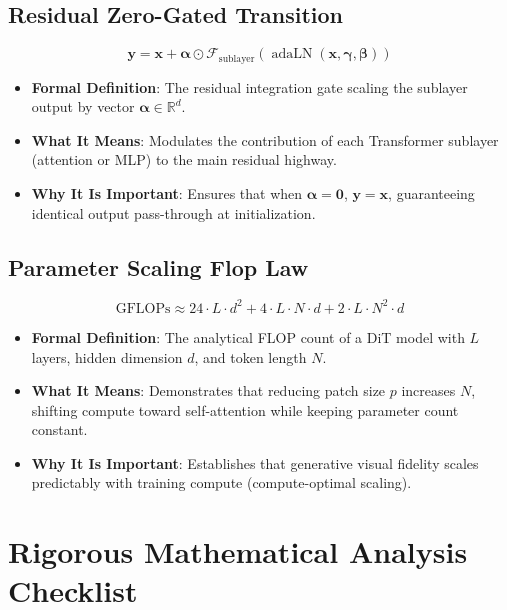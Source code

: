 \documentclass[11pt,a4paper]{article}
\theoremstyle{definition}
\begin{document}
\subsection{Residual Zero-Gated Transition}
{\boldmath
\begin{equation}
\mathbf{y} = \mathbf{x} + \boldsymbol{\alpha} \odot \mathcal{F}_{\text{sublayer}}(\operatorname{adaLN}(\mathbf{x}, \boldsymbol{\gamma}, \boldsymbol{\beta}))
\end{equation}
}
\begin{itemize}
    \item \textbf{Formal Definition}: The residual integration gate scaling the sublayer output by vector $\boldsymbol{\alpha} \in \mathbb{R}^d$.
    \item \textbf{What It Means}: Modulates the contribution of each Transformer sublayer (attention or MLP) to the main residual highway.
    \item \textbf{Why It Is Important}: Ensures that when $\boldsymbol{\alpha} = \mathbf{0}$, $\mathbf{y} = \mathbf{x}$, guaranteeing identical output pass-through at initialization.
\end{itemize}

\subsection{Parameter Scaling Flop Law}
{\boldmath
\begin{equation}
\text{GFLOPs} \approx 24 \cdot L \cdot d^2 + 4 \cdot L \cdot N \cdot d + 2 \cdot L \cdot N^2 \cdot d
\end{equation}
}
\begin{itemize}
    \item \textbf{Formal Definition}: The analytical FLOP count of a DiT model with $L$ layers, hidden dimension $d$, and token length $N$.
    \item \textbf{What It Means}: Demonstrates that reducing patch size $p$ increases $N$, shifting compute toward self-attention while keeping parameter count constant.
    \item \textbf{Why It Is Important}: Establishes that generative visual fidelity scales predictably with training compute (compute-optimal scaling).
\end{itemize}

\section{Rigorous Mathematical Analysis Checklist}
\end{document}
